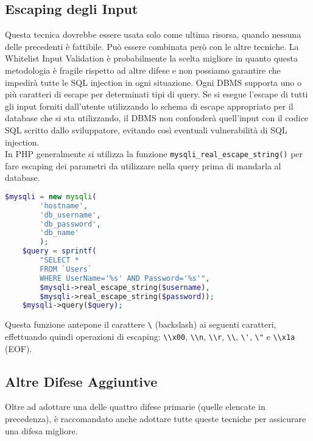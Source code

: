 \subsection{Escaping degli Input}

Questa tecnica dovrebbe essere usata solo come ultima risorsa,
quando nessuna delle
precedenti è fattibile. Può essere combinata però con le altre tecniche.
La Whitelist Input Validation è probabilmente la scelta migliore
in quanto questa
metodologia è fragile rispetto ad altre difese e non possiamo garantire che
impedirà tutte le
SQL injection in ogni situazione.
Ogni DBMS supporta uno o più caratteri di escape per determinati tipi di query.
Se si esegue
l'escape di tutti gli input forniti dall'utente utilizzando lo schema di escape
appropriato per il
database che si sta utilizzando, il DBMS non confonderà quell'input con il codice
SQL scritto
dallo sviluppatore, evitando così eventuali vulnerabilità di SQL injection.\\

In PHP generalmente si utilizza la funzione \verb|mysqli_real_escape_string()|
per fare escaping dei parametri da utilizzare nella query prima di mandarla
al database.

\begin{lstlisting}[language=Php]
    $mysqli = new mysqli(
        'hostname', 
        'db_username', 
        'db_password', 
        'db_name'
        );
    $query = sprintf(
        "SELECT * 
        FROM `Users` 
        WHERE UserName='%s' AND Password='%s'", 
        $mysqli->real_escape_string($username), 
        $mysqli->real_escape_string($password));
    $mysqli->query($query);
\end{lstlisting}

Questa funzione antepone il carattere \verb|\| (backslash) ai seguenti caratteri,
effettuando quindi operazioni di escaping: \verb|\\x00|, \verb|\\n|, \verb|\\r|,
\verb|\\|, \verb|\'|, \verb|\"| e \verb|\\x1a| (EOF).

\subsection{Altre Difese Aggiuntive}

Oltre ad adottare una delle quattro difese primarie (quelle elencate in precedenza), è raccomandato anche adottare tutte queste tecniche per assicurare una difesa migliore.

